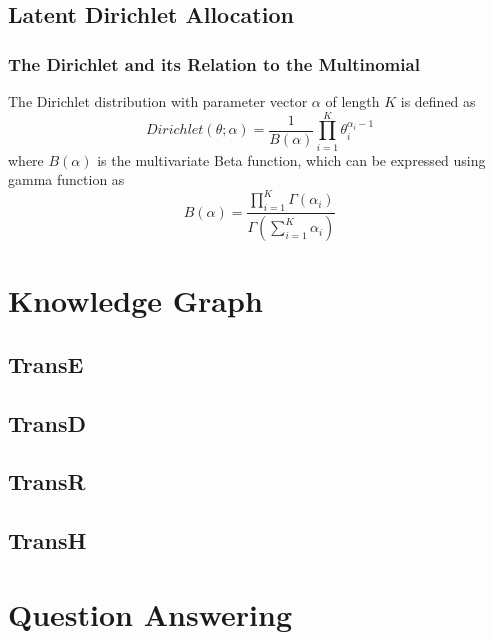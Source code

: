 \documentclass[a3paper, 12pt]{book} %
\begin{document}
\section{Latent Dirichlet Allocation}
\subsection{The Dirichlet and its Relation to the Multinomial}
The Dirichlet distribution with parameter vector $\alpha$ of length $K$ is defined as 
\begin{equation}
Dirichlet(\theta;\alpha)=\frac{1}{B{(\alpha)}}\prod_{i=1}^{K}{\theta_i^{\alpha_i-1}}
\end{equation}
where $B(\alpha)$ is the multivariate Beta function, which can be expressed using gamma function as 
\begin{equation}
B(\alpha)=\frac{\prod_{i=1}^{K}{\Gamma{(\alpha_i)}}}{\Gamma{(\sum_{i=1}^{K}{\alpha_i})}}
\end{equation}



\chapter{Knowledge Graph}
\section{TransE}
\section{TransD}
\section{TransR}
\section{TransH}



\chapter{Question Answering}
\end{document}

